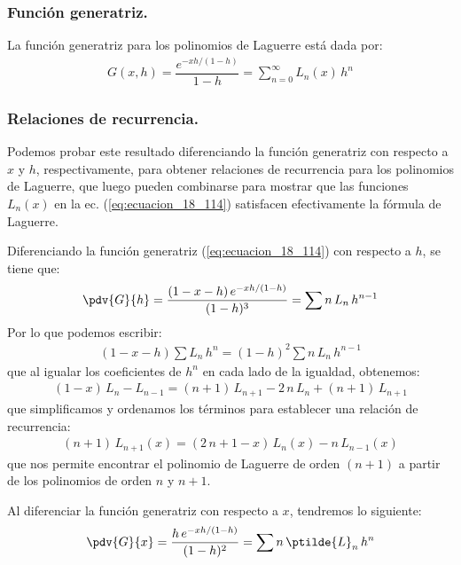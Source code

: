 \subsubsection{Función generatriz.}
La función generatriz para los polinomios de Laguerre está dada por:
\begin{align}
G(x, h) = \dfrac{e^{-xh/(1-h)}}{1- h} = \sum_{n=0}^{\infty} L_{n} (x) \, h^{n}
\label{eq:ecuacion_18_114}
\end{align}
\subsubsection{Relaciones de recurrencia.}\label{sec:subsub_relaciones_recurrencia}

Podemos probar este resultado diferenciando la función generatriz con respecto a $x$ y $h$, respectivamente, para obtener relaciones de recurrencia para los polinomios de Laguerre, que luego pueden combinarse para mostrar que las funciones $L_{n} (x)$ en la ec. (\ref{eq:ecuacion_18_114}) satisfacen efectivamente la fórmula de Laguerre.
\par
Diferenciando la función generatriz (\ref{eq:ecuacion_18_114}) con respecto a $h$, se tiene que:
\begin{align*}
\pdv{G}{h} = \dfrac{(1 - x -h) \, e^{-xh/(1-h)}}{(1- h )^{3}} = \sum n \, L_{n} \, h^{n-1}
\end{align*}
Por lo que podemos escribir:
\begin{align*}
(1 - x - h) \sum L_{n} \, h^{n} = (1 - h)^{2} \sum n \, L_{n} \, h^{n-1}
\end{align*}
que al igualar los coeficientes de $h^{n}$ en cada lado de la igualdad, obtenemos:
\begin{align*}
(1 - x) \, L_{n} - L_{n-1} = (n + 1) \, L_{n+1} - 2 \, n \, L_{n} + (n + 1) \, L_{n+1}
\end{align*}
que simplificamos y ordenamos los términos para establecer una relación de recurrencia:
\begin{align}
(n + 1) \, L_{n+1} (x) = (2 \, n + 1 - x) \, L_{n}(x) - n \, L_{n-1} (x)
\label{eq:ecuacion_18_115}
\end{align}
que nos permite encontrar el polinomio de Laguerre de orden $(n+1)$ a partir de los polinomios de orden $n$ y $n+1$.
\par
Al diferenciar la función generatriz con respecto a $x$, tendremos lo siguiente:
\begin{align*}
\pdv{G}{x} = \dfrac{h \, e^{-xh/(1-h)}}{(1 - h)^{2}} = \sum n \, \ptilde{L}_{n} \, h^{n}
\end{align*}
